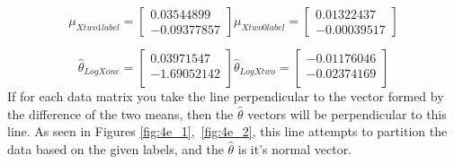 \documentclass[11pt]{article}
\newenvironment{problem}[2][Problem]{\begin{trivlist}
\item[\hskip \labelsep {\bfseries #1}\hskip \labelsep {\bfseries #2.}]}{\end{trivlist}}
\begin{document}
\begin{problem}{2.4}
\[\mu_{Xtwo1label}=
	\begin{bmatrix}
		0.03544899\\
		-0.09377857
	 \end{bmatrix}
   \mu_{Xtwo0label}=
	\begin{bmatrix}
		0.01322437\\
		-0.00039517
	 \end{bmatrix}
\]

\[\hat{\theta}_{LogXone}=
	\begin{bmatrix}
		0.03971547\\
		-1.69052142\\
	 \end{bmatrix}
   \hat{\theta}_{LogXtwo}=
	\begin{bmatrix}
		-0.01176046\\
		-0.02374169\\
	 \end{bmatrix}
\]
If for each data matrix you take the line perpendicular to the vector formed by the difference of the two means, then the $\hat{\theta}$ vectors will be perpendicular to this line. As seen in Figures \ref{fig:4e_1},~\ref{fig:4e_2}, this line attempts to partition the data based on the given labels, and the $\hat{\theta}$ is it's normal vector.
\end{problem}
\end{document}
